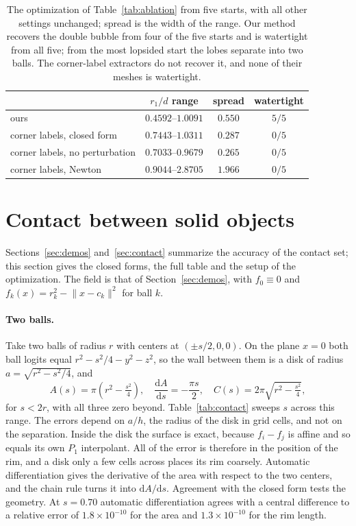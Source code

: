 \documentclass[11pt]{article}
\theoremstyle{definition}
\begin{document}
\begin{table}[htbp]
\centering
\caption{The optimization of Table~\ref{tab:ablation} from five starts, with
all other settings unchanged; spread is the width of the range. Our method
recovers the double bubble from four of the five starts and is watertight
from all five; from the most lopsided start the lobes separate into two
balls. The corner-label extractors do not recover it, and none of their
meshes is watertight.}
\label{tab:basins}
\small
\begin{tabular}{@{}lccc@{}}
\toprule
& $r_1/d$ range & spread & watertight \\
\midrule
ours                       & $0.4592$--$1.0091$ & $0.550$ & $5/5$ \\
corner labels, closed form & $0.7443$--$1.0311$ & $0.287$ & $0/5$ \\
corner labels, no perturbation & $0.7033$--$0.9679$ & $0.265$ & $0/5$ \\
corner labels, Newton      & $0.9044$--$2.8705$ & $1.966$ & $0/5$ \\
\bottomrule
\end{tabular}
\end{table}

\section{Contact between solid objects}
\label{sec:contact-supp}

Sections~\ref{sec:demos} and~\ref{sec:contact} summarize the accuracy of
the contact set; this section gives the closed forms, the full table and the
setup of the optimization. The field is that of Section~\ref{sec:demos},
with $f_0 \equiv 0$ and $f_k(x) = r_k^2 - \lVert x - c_k\rVert^2$ for ball $k$.

\paragraph*{Two balls.} Take two balls of radius $r$ with centers at
$(\pm s/2, 0, 0)$. On the plane $x=0$ both ball logits equal
$r^2 - s^2/4 - y^2 - z^2$, so the wall between them is a disk of radius
$a=\sqrt{r^2-s^2/4}$, and
\[
  A(s) = \pi\!\left(r^2 - \tfrac{s^2}{4}\right),\quad
  \frac{\mathrm{d}A}{\mathrm{d}s} = -\frac{\pi s}{2},\quad
  C(s) = 2\pi\sqrt{r^2 - \tfrac{s^2}{4}},
\]
for $s<2r$, with all three zero beyond. Table~\ref{tab:contact} sweeps $s$
across this range. The errors depend on $a/h$, the radius of the disk in
grid cells, and not on the separation. Inside the disk the surface is exact,
because $f_i-f_j$ is affine and so equals its own $P_1$ interpolant. All of
the error is therefore in the position of the rim, and a disk only a few
cells across places its rim coarsely. Automatic differentiation gives the
derivative of the area with respect to the two centers, and the chain rule
turns it into $\mathrm{d}A/\mathrm{d}s$. Agreement with the closed form
tests the geometry. At $s=0.70$ automatic differentiation agrees with a
central difference to a relative error of $1.8\times10^{-10}$ for the area
and $1.3\times10^{-10}$ for the rim length.
\end{document}
